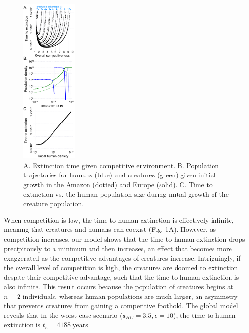 \documentclass{article}[10pt]
\begin{document}
\begin{figure}
\singlespacing
  \vspace{-35pt}
  \begin{center}
    \includegraphics[width=0.25\textwidth]{fig_combined.pdf}
  \end{center}
  \vspace{-15pt}
  \caption{\footnotesize 
  A. Extinction time given competitive environment.
  B. Population trajectories for humans (blue) and creatures (green) given initial growth in the Amazon (dotted) and Europe (solid).
  C. Time to extinction vs. the human population size during initial growth of the creature population.
  }
  \vspace{2pt}
    \label{fig}
\end{figure}
When competition is low, the time to human extinction is effectively infinite, meaning that creatures and humans can coexist (Fig. 1A).
However, as competition increases, our model shows that the time to human extinction drops precipitously to a minimum and then increases, an effect that becomes more exaggerated as the competitive advantages of creatures increase.
Intriguingly, if the overall level of competition is high, the creatures are doomed to extinction despite their competitive advantage, such that the time to human extinction is also infinite.
This result occurs because the population of creatures begins at $n=2$ individuals, whereas human populations are much larger, an asymmetry that prevents creatures from gaining a competitive foothold.
The global model reveals that in the worst case scenario ($a_{HC}=3.5, \epsilon=10$), the time to human extinction is $t_e = 4188$ years.
\end{document}
